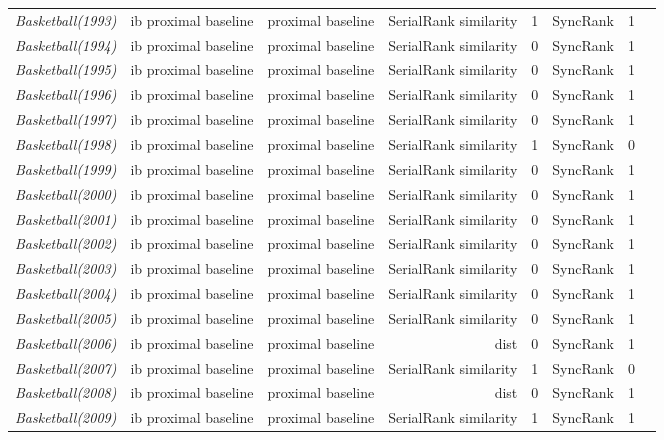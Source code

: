 \documentclass[nohyperref]{article}
\theoremstyle{plain}
\theoremstyle{definition}
\theoremstyle{remark}
\begin{document}
\begin{table*}[!ht]
{\begin{tabular}{lrrrrrrr}
			{\it Basketball(1993)} & ib proximal baseline & proximal baseline & SerialRank similarity & 1 & SyncRank & 1 \\
			{\it Basketball(1994)} & ib proximal baseline & proximal baseline & SerialRank similarity & 0 & SyncRank & 1 \\
			{\it Basketball(1995)} & ib proximal baseline & proximal baseline & SerialRank similarity & 0 & SyncRank & 1 \\
			{\it Basketball(1996)} & ib proximal baseline & proximal baseline & SerialRank similarity & 0 & SyncRank & 1 \\
			{\it Basketball(1997)} & ib proximal baseline & proximal baseline & SerialRank similarity & 0 & SyncRank & 1 \\
			{\it Basketball(1998)} & ib proximal baseline & proximal baseline & SerialRank similarity & 1 & SyncRank & 0 \\
			{\it Basketball(1999)} & ib proximal baseline & proximal baseline & SerialRank similarity & 0 & SyncRank & 1 \\
			{\it Basketball(2000)} & ib proximal baseline & proximal baseline & SerialRank similarity & 0 & SyncRank & 1 \\
			{\it Basketball(2001)} & ib proximal baseline & proximal baseline & SerialRank similarity & 0 & SyncRank & 1 \\
			{\it Basketball(2002)} & ib proximal baseline & proximal baseline & SerialRank similarity & 0 & SyncRank & 1 \\
			{\it Basketball(2003)} & ib proximal baseline & proximal baseline & SerialRank similarity & 0 & SyncRank & 1 \\
			{\it Basketball(2004)} & ib proximal baseline & proximal baseline & SerialRank similarity & 0 & SyncRank & 1 \\
			{\it Basketball(2005)} & ib proximal baseline & proximal baseline & SerialRank similarity & 0 & SyncRank & 1 \\
			{\it Basketball(2006)} & ib proximal baseline & proximal baseline & dist & 0 & SyncRank & 1 \\
			{\it Basketball(2007)} & ib proximal baseline & proximal baseline & SerialRank similarity & 1 & SyncRank & 0 \\
			{\it Basketball(2008)} & ib proximal baseline & proximal baseline & dist & 0 & SyncRank & 1 \\
			{\it Basketball(2009)} & ib proximal baseline & proximal baseline & SerialRank similarity & 1 & SyncRank & 1 \\

\end{tabular}}
\end{table*}
\end{document}
